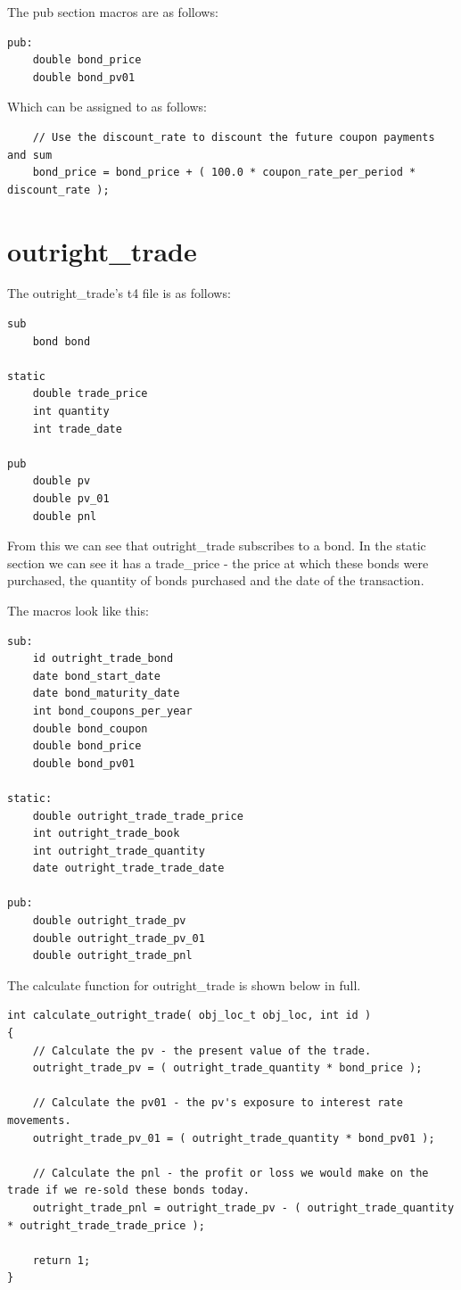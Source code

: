 \documentclass{report}
\begin{document}
The pub section macros are as follows:

\begin{verbatim}
pub:
    double bond_price
    double bond_pv01

\end{verbatim}

Which can be assigned to as follows:

\begin{verbatim}
    // Use the discount_rate to discount the future coupon payments and sum
    bond_price = bond_price + ( 100.0 * coupon_rate_per_period * discount_rate );
\end{verbatim}

\section{outright_trade}

The outright_trade's t4 file is as follows:


\begin{verbatim}
sub
    bond bond

static
    double trade_price
    int quantity
    int trade_date

pub
    double pv
    double pv_01
    double pnl
\end{verbatim}

From this we can see that outright_trade subscribes to a bond. In the static section we can see it has a trade_price - the price at which these bonds were purchased, the quantity of bonds purchased and the date of the transaction.

The macros look like this:

\begin{verbatim}
sub:
    id outright_trade_bond
    date bond_start_date
    date bond_maturity_date
    int bond_coupons_per_year
    double bond_coupon
    double bond_price
    double bond_pv01

static:
    double outright_trade_trade_price
    int outright_trade_book
    int outright_trade_quantity
    date outright_trade_trade_date

pub:
    double outright_trade_pv
    double outright_trade_pv_01
    double outright_trade_pnl

\end{verbatim}

The calculate function for outright_trade is shown below in full.

\begin{verbatim}
int calculate_outright_trade( obj_loc_t obj_loc, int id )
{
    // Calculate the pv - the present value of the trade.
    outright_trade_pv = ( outright_trade_quantity * bond_price );

    // Calculate the pv01 - the pv's exposure to interest rate movements.
    outright_trade_pv_01 = ( outright_trade_quantity * bond_pv01 );

    // Calculate the pnl - the profit or loss we would make on the trade if we re-sold these bonds today.
    outright_trade_pnl = outright_trade_pv - ( outright_trade_quantity * outright_trade_trade_price );

    return 1;
}
\end{verbatim}
\end{document}
